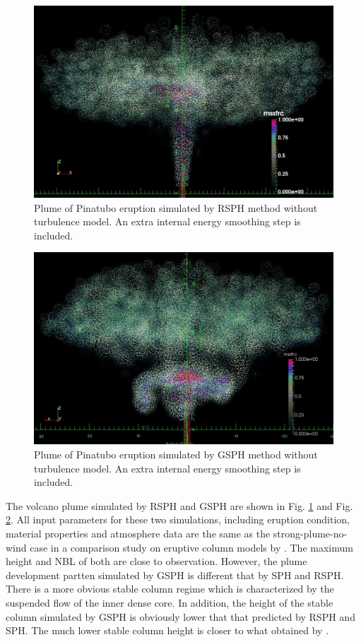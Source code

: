 \begin{figure}
\center
\includegraphics[width=0.75 \textwidth]{Chapter-6/Figures/RSPH_mssfrc_420s}
\caption{Plume of Pinatubo eruption simulated by RSPH method without turbulence model. An extra internal energy smoothing step is included.}
\label{fig:Pinatubo-RSPH}
\end{figure}

\begin{figure}
\center
\includegraphics[width=0.75 \textwidth]{Chapter-6/Figures/GSPH_mssfrc_640s}
\caption{Plume of Pinatubo eruption simulated by GSPH method without turbulence model. An extra internal energy smoothing step is included.}
\label{fig:Pinatubo-GSPH}
\end{figure}

The volcano plume simulated by RSPH and GSPH are shown in Fig. \ref{fig:Pinatubo-RSPH} and Fig. \ref{fig:Pinatubo-GSPH}. 
All input parameters for these two simulations, including eruption condition, material properties and atmosphere data are the same as the strong-plume-no-wind case in a comparison study on eruptive column models by \citet{costa2016results}.
The maximum height and NBL of both are close to observation. However, the plume development partten simulated by GSPH is different that by SPH and RSPH. There is a more obvious stable column regime which is characterized by the suspended flow of the inner dense core. In addition, the height of the stable column simulated by GSPH is obviously lower that that predicted by RSPH and SPH. The much lower stable column height is closer to what obtained by \citet{suzuki2005numerical}.

